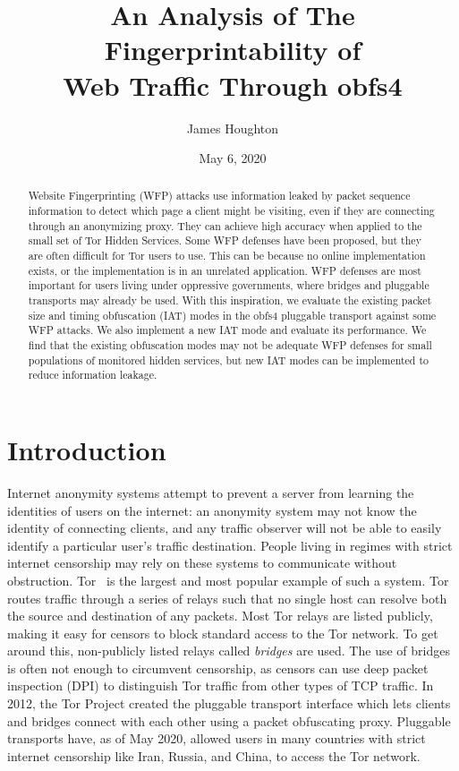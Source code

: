 \documentclass[11pt]{article}
\title{An Analysis of The Fingerprintability of\\Web Traffic Through obfs4}
\author{James Houghton}
\affil[]{\textit{jth5zs@virginia.edu}}
\date{May 6, 2020}
\begin{document}
\maketitle

\begin{abstract}
Website Fingerprinting (WFP) attacks use information leaked by packet sequence information to detect which page a client might be visiting, even if they are connecting through an anonymizing proxy. They can achieve high accuracy when applied to the small set of Tor Hidden Services. Some WFP defenses have been proposed, but they are often difficult for Tor users to use. This can be because no online implementation exists, or the implementation is in an unrelated application. WFP defenses are most important for users living under oppressive governments, where bridges and pluggable transports may already be used. With this inspiration, we evaluate the existing packet size and timing obfuscation (IAT) modes in the obfs4 pluggable transport against some WFP attacks. We also implement a new IAT mode and evaluate its performance. We find that the existing obfuscation modes may not be adequate WFP defenses for small populations of monitored hidden services, but new IAT modes can be implemented to reduce information leakage.
\end{abstract}

\section{Introduction}
Internet anonymity systems attempt to prevent a server from learning the identities of users on the internet: an anonymity system may not know the identity of connecting clients, and any traffic observer will not be able to easily identify a particular user's traffic destination. People living in regimes with strict internet censorship may rely on these systems to communicate without obstruction. Tor~\cite{tor} is the largest and most popular example of such a system. Tor routes traffic through a series of relays such that no single host can resolve both the source and destination of any packets. Most Tor relays are listed publicly, making it easy for censors to block standard access to the Tor network. To get around this, non-publicly listed relays called \textit{bridges} are used. The use of bridges is often not enough to circumvent censorship, as censors can use deep packet inspection (DPI) to distinguish Tor traffic from other types of TCP traffic. In 2012, the Tor Project created the pluggable transport interface which lets clients and bridges connect with each other using a packet obfuscating proxy. Pluggable transports have, as of May 2020, allowed users in many countries with strict internet censorship like Iran, Russia, and China, to access the Tor network.
\end{document}
